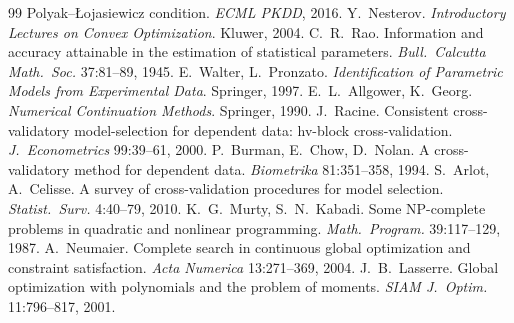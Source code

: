 \documentclass[11pt]{article}
\theoremstyle{plain}
\theoremstyle{definition}
\theoremstyle{remark}
\begin{document}
\begin{thebibliography}{99}
 Polyak--{\L}ojasiewicz condition. \textit{ECML PKDD}, 2016.
 Y.~Nesterov. \textit{Introductory Lectures on
 Convex Optimization}. Kluwer, 2004.
 C.~R.~Rao. Information and accuracy attainable in the
 estimation of statistical parameters. \textit{Bull.\ Calcutta Math.\
 Soc.} 37:81--89, 1945.
 E.~Walter, L.~Pronzato. \textit{Identification of
 Parametric Models from Experimental Data}. Springer, 1997.
 E.~L.~Allgower, K.~Georg. \textit{Numerical
 Continuation Methods}. Springer, 1990.
 J.~Racine. Consistent cross-validatory
 model-selection for dependent data: hv-block cross-validation.
 \textit{J.~Econometrics} 99:39--61, 2000.
 P.~Burman, E.~Chow, D.~Nolan. A cross-validatory
 method for dependent data. \textit{Biometrika} 81:351--358, 1994.
\bibitem{arlot2010} S.~Arlot, A.~Celisse. A survey of cross-validation
 procedures for model selection. \textit{Statist.\ Surv.} 4:40--79, 2010.
\bibitem{murty1987} K.~G.~Murty, S.~N.~Kabadi. Some NP-complete problems
 in quadratic and nonlinear programming. \textit{Math.\ Program.}
 39:117--129, 1987.
 A.~Neumaier. Complete search in continuous global
 optimization and constraint satisfaction. \textit{Acta Numerica}
 13:271--369, 2004.
 J.~B.~Lasserre. Global optimization with
 polynomials and the problem of moments. \textit{SIAM J.~Optim.}
 11:796--817, 2001.
\end{thebibliography}
\end{document}
